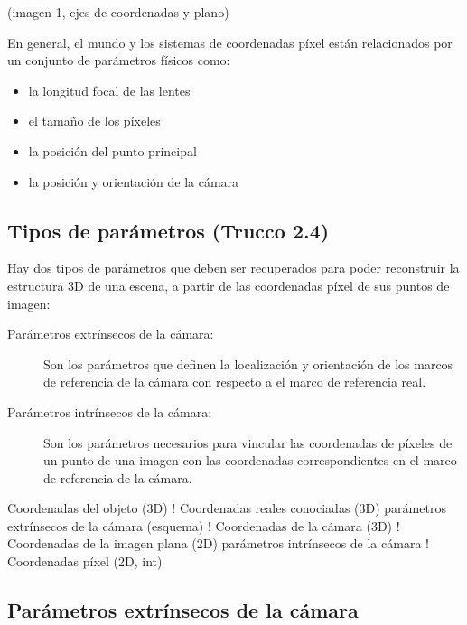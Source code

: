   (imagen 1, ejes de coordenadas y plano)

En general, el mundo y los sistemas de coordenadas píxel están relacionados por un conjunto de parámetros físicos como:
\begin{itemize}
     \item la longitud focal de las lentes
     \item el tamaño de los píxeles
     \item la posición del punto  principal
     \item la posición y orientación de la cámara
\end{itemize}
\subsection{Tipos de parámetros (Trucco 2.4)}

Hay dos tipos de parámetros que deben ser recuperados para poder reconstruir la estructura 3D de una escena, a partir de las coordenadas píxel de sus puntos de imagen:
\begin{description}
\item[Parámetros extrínsecos de la cámara:] Son los parámetros que definen la localización y orientación de los marcos de referencia de la cámara con respecto a el marco de referencia real.
  \item[Parámetros intrínsecos de la cámara:] Son los parámetros necesarios para vincular las coordenadas de píxeles de un punto de una imagen con las coordenadas correspondientes en el marco de referencia de la cámara.
  \end{description}
  Coordenadas del objeto (3D)
                                                   !
                                       Coordenadas reales conociadas (3D)         parámetros extrínsecos de la cámara 
(esquema)
                                                   !
                                       Coordenadas de la cámara (3D)
                                                   !
                                       Coordenadas de la imagen plana (2D)         parámetros intrínsecos de la cámara 
                                                   !
                                       Coordenadas píxel (2D, int)                                            

\subsection{Parámetros extrínsecos de la cámara}

